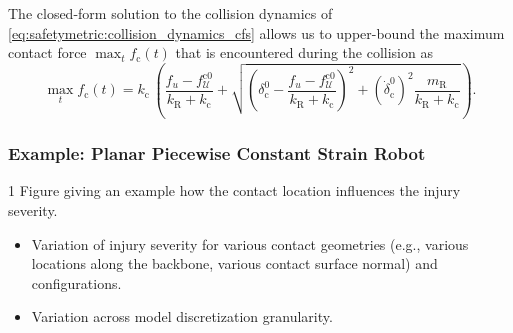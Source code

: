 The closed-form solution to the collision dynamics of \eqref{eq:safetymetric:collision_dynamics_cfs} allows us to upper-bound the maximum contact force $\max_t f_\mathrm{c}(t)$ that is encountered during the collision as
\begin{equation}
     \max_{t}f_\mathrm{c}(t) = k_\mathrm{c} \, \left ( \frac{f_u-f_{\mathcal{U}}^{\mathrm{c}0}}{k_\mathrm{R} + k_\mathrm{c}} + \sqrt{\left ( \delta_\mathrm{c}^0 - \frac{f_u-f_{\mathcal{U}}^{\mathrm{c}0}}{k_\mathrm{R} + k_\mathrm{c}} \right )^2 + \left (\dot{\delta}_\mathrm{c}^0 \right )^2 \frac{m_\mathrm{R}}{k_\mathrm{R} + k_\mathrm{c}} } \right ).
\end{equation}


\subsubsection{Example: Planar Piecewise Constant Strain Robot}
1 Figure giving an example how the contact location influences the injury severity.
\begin{itemize}
    \item Variation of injury severity for various contact geometries (e.g., various locations along the backbone, various contact surface normal) and configurations.
    \item Variation across model discretization granularity.
\end{itemize}

